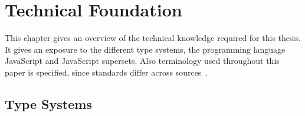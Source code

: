 \chapter{Technical Foundation}
\label{cha:technical-foundation}

This chapter gives an overview of the technical knowledge required for this thesis. It gives an exposure to the different type systems, the programming language JavaScript and JavaScript supersets. Also terminology used throughout this paper is specified, since standards differ across sources~\cite[p.~1]{TypeSystems:Cardelli:2004}.

\section{Type Systems}
\label{sec:type-systems}

